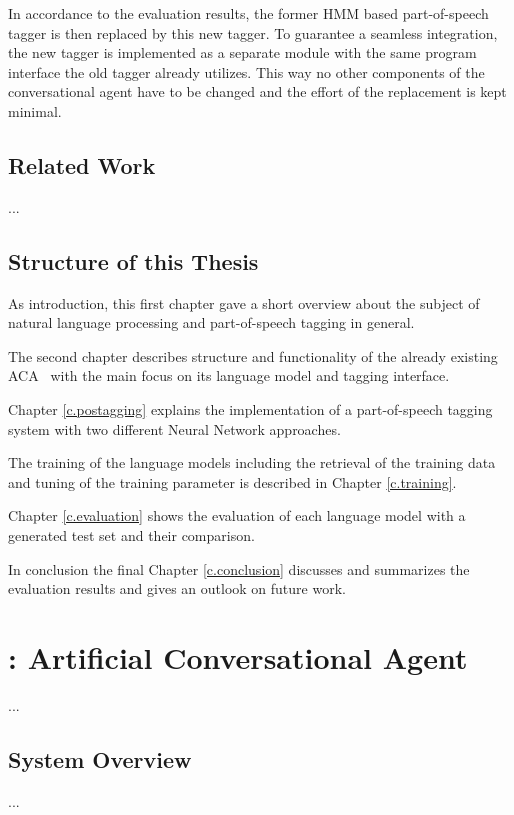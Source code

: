 In accordance to the evaluation results, the former HMM based part-of-speech tagger is then replaced by this new tagger. To guarantee a seamless integration, the new tagger is implemented as a separate module with the same program interface the old tagger already utilizes. This way no other components of the conversational agent have to be changed and the effort of the replacement is kept minimal.

\section{Related Work}\label{c.introduction.related}
...

\section{Structure of this Thesis}\label{c.introduction.structure}
As introduction, this first chapter gave a short overview about the subject of natural language processing and part-of-speech tagging in general.

The second chapter describes structure and functionality of the already existing ACA \Alex\ with the main focus on its language model and tagging interface.

Chapter \ref{c.postagging} explains the implementation of a part-of-speech tagging system with two different Neural Network approaches.

The training of the language models including the retrieval of the training data and tuning of the training parameter is described in Chapter \ref{c.training}.

Chapter \ref{c.evaluation} shows the evaluation of each language model with a generated test set and their comparison.

In conclusion the final Chapter \ref{c.conclusion} discusses and summarizes the evaluation results and gives an outlook on future work.

\chapter{\Alex: Artificial Conversational Agent}\label{c.alex}
...

\section{System Overview}\label{c.alex.overview}
...

